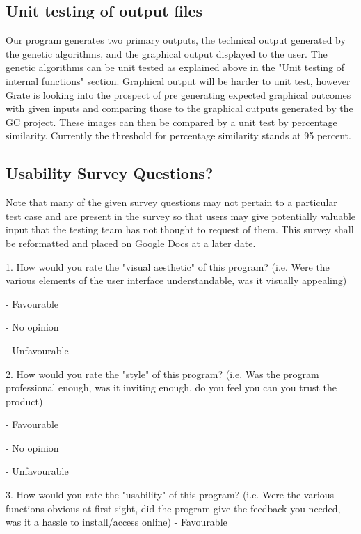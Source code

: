 \documentclass[12pt, titlepage]{article}
\begin{document}
\subsection{Unit testing of output files}		

Our program generates two primary outputs, the technical output generated by the 
genetic algorithms, and the graphical output displayed to the user. The genetic 
algorithms can be unit tested as explained above in the "Unit testing of 
internal functions" section. Graphical output will be harder to unit test, 
however Grate is looking into the prospect of pre generating expected graphical 
outcomes with given inputs and comparing those to the graphical outputs 
generated by the GC project. These images can then be compared by a unit test by 
percentage similarity. Currently the threshold for percentage similarity stands 
at 95 percent.





\newpage

\subsection{Usability Survey Questions?}

Note that many of the given survey questions may not pertain to a particular 
test case and are present in the survey so that users may give potentially 
valuable input that the testing team has not thought to request of them. This 
survey shall be reformatted and placed on Google Docs at a later date.

1. How would you rate the "visual aesthetic" of this program? (i.e. Were the 
various elements of the user interface understandable, was it visually 
appealing)

- Favourable

- No opinion

- Unfavourable

2. How would you rate the "style" of this program? (i.e. Was the program 
professional enough, was it inviting enough,  do you feel you can you trust the 
product)

- Favourable

- No opinion

- Unfavourable

3. How would you rate the "usability" of this program? (i.e. Were the various 
functions obvious at first sight, did the program give the feedback you needed, 
was it a hassle to install/access online)
- Favourable
\end{document}
